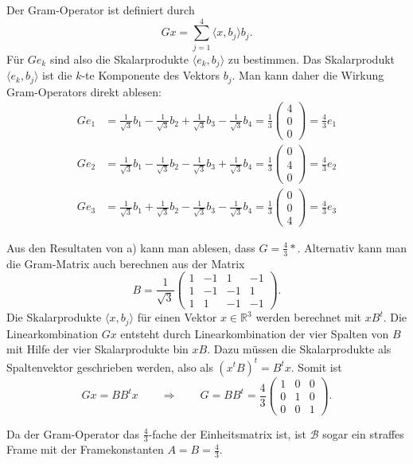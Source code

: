 \begin{loesung}
\begin{teilaufgaben}
\item
Der Gram-Operator ist definiert durch
\[
Gx = \sum_{j=1}^4 \langle x,b_j\rangle b_j.
\]
Für $Ge_k$ sind also die Skalarprodukte $\langle e_k,b_j\rangle$
zu bestimmen.
Das Skalarprodukt $\langle e_k,b_j\rangle$ ist die $k$-te Komponente 
des Vektors $b_j$.
Man kann daher die Wirkung Gram-Operators direkt ablesen:
\begin{align*}
Ge_1
&=
\frac{1}{\sqrt{3}} b_1
-
\frac{1}{\sqrt{3}} b_2
+
\frac{1}{\sqrt{3}} b_3
-
\frac{1}{\sqrt{3}} b_4
=
\frac13
\begin{pmatrix}
4\\0\\0
\end{pmatrix}
=
\frac43 e_1
\\
Ge_2
&=
\frac{1}{\sqrt{3}} b_1
-
\frac{1}{\sqrt{3}} b_2
-
\frac{1}{\sqrt{3}} b_3
+
\frac{1}{\sqrt{3}} b_4
=
\frac13
\begin{pmatrix}
0\\4\\0
\end{pmatrix}
=
\frac43 e_2
\\
Ge_3
&=
\frac{1}{\sqrt{3}} b_1
+
\frac{1}{\sqrt{3}} b_2
-
\frac{1}{\sqrt{3}} b_3
-
\frac{1}{\sqrt{3}} b_4
=
\frac13
\begin{pmatrix}
0\\0\\4
\end{pmatrix}
=
\frac43 e_3
\end{align*}
\item
Aus den Resultaten von a) kann man ablesen, dass $G=\frac43*$.
Alternativ kann man die Gram-Matrix auch berechnen aus der Matrix 
\[
B
=
\frac{1}{\sqrt{3}}
\begin{pmatrix}
 1&-1& 1&-1\\
 1&-1&-1& 1\\
 1& 1&-1&-1
\end{pmatrix}.
\]
Die Skalarprodukte $\langle x,b_j\rangle$ für einen Vektor $x\in\mathbb R^3$
werden berechnet mit $xB^t$.
Die Linearkombination $Gx$ entsteht durch Linearkombination der vier Spalten
von $B$ mit Hilfe der vier Skalarprodukte bin $xB$.
Dazu müssen die Skalarprodukte als Spaltenvektor geschrieben werden, also
als $(x^tB)^t=B^tx$.
Somit ist
\[
Gx = BB^t x
\qquad\Rightarrow\qquad
G=BB^t
=
\frac{4}{3}
\begin{pmatrix}
1&0&0\\
0&1&0\\
0&0&1
\end{pmatrix}.
\]
\item
Da der Gram-Operator das $\frac43$-fache der Einheitsmatrix ist, ist
$\mathcal{B}$ sogar ein straffes Frame mit der Framekonstanten $A=B=\frac43$.
\qedhere
\end{teilaufgaben}
\end{loesung}

